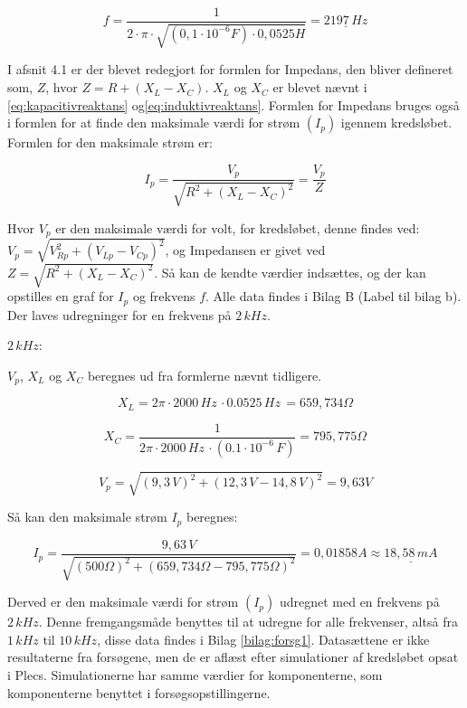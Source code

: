 \begin{equation*}
f = \frac{1}{2 \cdot \pi \cdot \sqrt{(0,1 \cdot 10^{-6} F) \cdot 0,0525 H}} = \underline{2197 \, Hz}
\end{equation*}

I afsnit 4.1 er der blevet redegjort for formlen for Impedans, den bliver defineret som, $Z$, hvor $Z = R + (X_L - X_C)$. $X_L$ og $X_C$ er blevet nævnt i \vref{eq:kapacitivreaktans} og\vref{eq:induktivreaktans}. Formlen for Impedans bruges også i formlen for at finde den maksimale værdi for strøm $(I_p)$ igennem kredsløbet. Formlen for den maksimale strøm er:

\begin{equation} 
I_p = \frac{V_p}{\sqrt{R^2 + (X_L - X_C )^2}} = \frac{V_p}{Z}
\label{eq:peak}
\end{equation}

Hvor $V_p$ er den maksimale værdi for volt, for kredsløbet, denne findes ved: $V_p = \sqrt{V^2_{Rp} + (V_{Lp} - V_{Cp})^2}$, og Impedansen er givet ved $Z = \sqrt{R^2 + (X_L - X_C)^2}$. Så kan de kendte værdier indsættes, og der kan opstilles en graf for $I_p$ og frekvens $f$. Alle data findes i Bilag B (Label til bilag b). Der laves udregninger for en frekvens på $2 \, kHz$.

$2 \, kHz$:

$V_p$, $X_L$ og $X_C$ beregnes ud fra formlerne nævnt tidligere.

\begin{equation*}
X_L = 2\pi \cdot 2000 \, Hz \, \cdot 0.0525 \, Hz \, = 659,734 \Omega
\end{equation*}

\begin{equation*}
X_C = \frac{1}{2\pi \cdot 2000 \, Hz \, \cdot (0.1 \cdot 10^{-6} \, F)} = 795,775 \Omega
\end{equation*}

\begin{equation*}
V_p = \sqrt{(9,3 \, V)^2 + (12,3 \, V - 14,8 \, V)^2} = 9,63 V
\end{equation*}

Så kan den maksimale strøm $I_p$ beregnes:

\begin{equation*}
I_p = \frac{9,63 \, V}{\sqrt{(500 \Omega)^2 + (659,734\Omega-795,775\Omega)^2}} = 0,01858 A \approx \underline{18,58 \, mA}
\end{equation*}

Derved er den maksimale værdi for strøm $(I_p)$ udregnet med en frekvens på $2 \, kHz$. Denne fremgangsmåde benyttes til at udregne for alle frekvenser, altså fra $1 \, kHz$ til $10 \, kHz$, disse data findes i Bilag \ref{bilag:forsg1}. Datasættene er ikke resultaterne fra forsøgene, men de er aflæst efter simulationer af kredsløbet opsat i Plecs. Simulationerne har samme værdier for komponenterne, som komponenterne benyttet i forsøgsopstillingerne.

